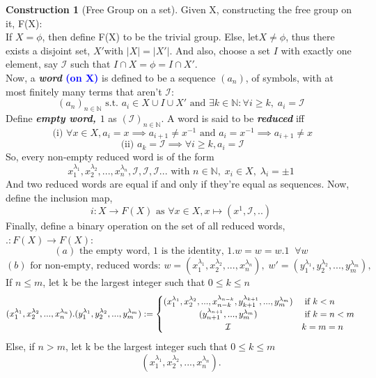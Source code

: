 \documentclass{article}
\theoremstyle{definition}
\theoremstyle{definition}
\newtheorem{construction}{Construction}[theorem]
\begin{document}
\begin{construction}[Free Group on a set]
	Given X, constructing the free group on it, F(X):\\
	If $X=\phi$, then define F(X) to be the trivial group. Else, let$X\neq \phi$, thus there exists a disjoint set, $X'$with $|X|=|X'|$.
	And also, choose a set $I$ with exactly one element, say $\mathcal{I} $ such that $I\cap X=\phi =I\cap X'$.\\
	Now, a \textbf{ \textit{word} \textcolor{blue}{(on X)}} is defined to be a sequence $(a_n)$, of symbols,
	with at most finitely many terms that aren't $\mathcal{I}$:
	\[ (a_n)_{n\in \mathbb{N}} \text{ s.t. } a_i \in X \cup I \cup X'
	\text{ and } \exists k \in \mathbb{N}: \forall i \geq k,\; a_i=\mathcal{I}   \]
	Define \textbf{\textit{empty word, $1$}} as $(\mathcal{I})_{n \in \mathbb{N}}$.
	A word is said to be \textbf{\textit{reduced}} iff
	\[ \text{ (i) }   \forall x \in X , a_i=x \implies a_{i+1} \neq x^{-1}
	\text{ and }  a_i = x^{-1} \implies a_{i+1} \neq x \]
	\[ \text{ (ii) } a_k=\mathcal{I} \implies \forall i \geq k , a_i=\mathcal{I} \]
	So, every non-empty reduced word is of the form
	\[ x_1^{\lambda_1},x_2^{\lambda_2},...,x_n^{\lambda_n},\mathcal{I},\mathcal{I},\mathcal{I}...
	\text{ with } n \in \mathbb{N} ,\; x_i \in X ,\; \lambda_i = \pm 1 \]
	And two reduced words are equal if and only if they're equal as sequences.
	Now, define the inclusion map,
	\[ i:X \rightarrow F(X) \text{ as } \forall x \in X, x \mapsto (x^1,\mathcal{I},.. ) \]
	Finally, define a binary operation on the set of all reduced words, $ .:F(X) \rightarrow F(X)$:
	\[ (a) \text{ the empty word, 1 is the identity, } 1.w=w=w.1 \; \;\forall w \]
	\[ (b) \text{ for non-empty, reduced words: } w=(x_1^{\lambda_1},x_2^{\lambda_2},...,x_n^{\lambda_n}), \;
	w' =(y_1^{\lambda_1},y_2^{\lambda_2},...,y_m^{\lambda_m}), \]
	If $n\leq m$, let k be the largest integer such that $0\leq k \leq n$
	\[ (x_1^{\lambda_1},x_2^{\lambda_2},...,x_n^{\lambda_n}).
		(y_1^{\lambda_1},y_2^{\lambda_2},...,y_m^{\lambda_m}):=
		\begin{cases}
			(x_1^{\lambda_1},x_2^{\lambda_2},...,x_{n-k}^{\lambda_{n-k}},
			y_{k+1}^{\lambda_{k+1}},...,y_m^{\lambda_m}) &\text{ if } k<n \\
			\hfil	(y_{n+1}^{\lambda_{n+1}},...,y_m^{\lambda_m}) & \text{ if } k=n<m \\
			\hfil		\mathcal{I} & k=m=n
		\end{cases} \]
		Else, if $n>m$, let k be the largest integer such that $0\leq k \leq m$
		\[ (x_1^{\lambda_1},x_2^{\lambda_2},...,x_n^{\lambda_n}).
\]
\end{construction}
\end{document}
